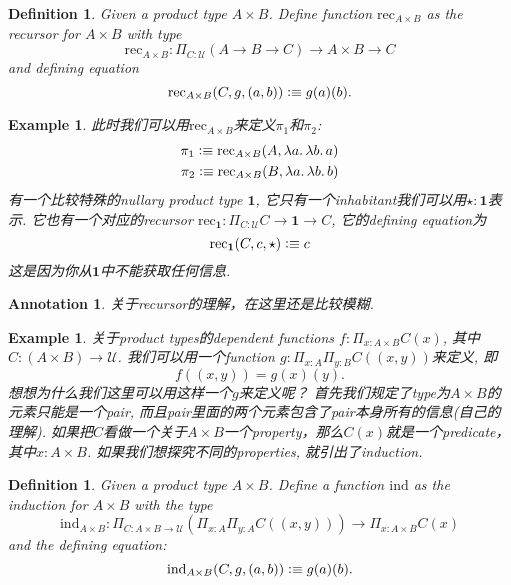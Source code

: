 \documentclass{article}
\newtheorem{example}[theorem]{Example}
\newtheorem{definition}[theorem]{Definition}
\newtheorem{annotation}[theorem]{Annotation}
\newcommand{\lam}[2]{\ensuremath{\lambda #1\ldotp #2}} %
\newcommand{\defeqv}{\vcentcolon\equiv}
\begin{document}
\begin{definition}
\rm Given a product type $A \times B$. Define function $\text{rec}_{A \times B}$ as the recursor for $A \times B$ with type
\[
	\text{rec}_{A \times B}:\Pi_{C:\mathcal{U}}(A \to B \to C) \to A \times B \to C
\]
and defining equation
\[
	\text{rec}_{A \times B}(C, g, (a,b)) \defeqv g(a)(b).
\]
\end{definition}

\begin{example}
\rm 此时我们可以用$\text{rec}_{A \times B}$来定义$\pi_1$和$\pi_2$:
\[
	\begin{aligned}
	\pi_1 \defeqv \text{rec}_{A \times B}(A, \lam{a}{\lam{b}{a}}) \\
	\pi_2 \defeqv \text{rec}_{A \times B}(B, \lam{a}{\lam{b}{b}})
	\end{aligned}
\]
有一个比较特殊的nullary product type $\mathbf{1}$, 它只有一个inhabitant我们可以用$\star:\mathbf{1}$表示. 它也有一个对应的recursor $\text{rec}_\mathbf{1}: \Pi_{C:\mathcal{U}} C \to \mathbf{1} \to C$, 它的defining equation为
\[
	\text{rec}_\mathbf{1}(C, c, \star) \defeqv c 
\]
这是因为你从$\mathbf{1}$中不能获取任何信息.
\end{example}

\begin{annotation}
\rm 关于recursor的理解，在这里还是比较模糊.
\end{annotation}

\begin{example}
\rm 关于product types的dependent functions $f: \Pi_{x:A\times B}C(x)$, 其中$C: (A \times B) \to \mathcal{U}$. 我们可以用一个function $g:\Pi_{x:A}\Pi_{y:B}C((x,y))$来定义, 即
\[
	f((x,y)) = g(x)(y).
\]
想想为什么我们这里可以用这样一个$g$来定义呢？ 首先我们规定了type为$A \times B$的元素只能是一个pair, 而且pair里面的两个元素包含了pair本身所有的信息(自己的理解). 如果把$C$看做一个关于$A \times B$一个property，那么$C(x)$就是一个predicate，其中$x: A \times B$. 如果我们想探究不同的properties, 就引出了induction.
\end{example}

\begin{definition}
\rm Given a product type $A \times B$. Define a function $\text{ind}$ as the induction for $A \times B$ with the type
\[
	\text{ind}_{A \times B}: {\Pi}_{C:A \times B \to \mathcal{U}}(\Pi_{x:A}\Pi_{y:A} C((x,y))) \to \Pi_{x:A\times B} C(x)
\]
and the defining equation:
\[
	\text{ind}_{A \times B}(C, g, (a,b)) \defeqv g(a)(b).
\]
\end{definition}
\end{document}

